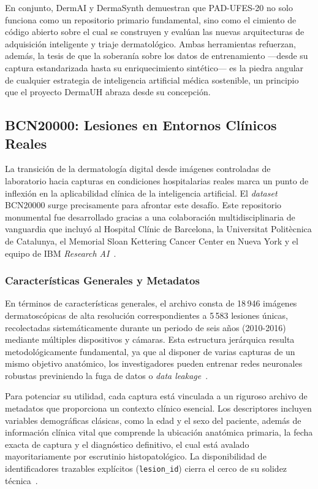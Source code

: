 En conjunto, DermAI y DermaSynth demuestran que PAD-UFES-20 no solo funciona como un repositorio primario 
fundamental, sino como el cimiento de código abierto sobre el cual se construyen y evalúan las nuevas 
arquitecturas de adquisición inteligente y triaje dermatológico. Ambas herramientas refuerzan, además, la 
tesis de que la soberanía sobre los datos de entrenamiento ---desde su captura estandarizada hasta su 
enriquecimiento sintético--- es la piedra angular de cualquier estrategia de inteligencia artificial 
médica sostenible, un principio que el proyecto DermaUH abraza desde su concepción.


\subsection{BCN20000: Lesiones en Entornos Clínicos Reales}\label{sec:bcn20000}

La transición de la dermatología digital desde imágenes controladas de laboratorio hacia capturas en 
condiciones hospitalarias reales marca un punto de inflexión en la aplicabilidad clínica de la inteligencia 
artificial. El \textit{dataset} BCN20000 surge precisamente para afrontar este desafío. Este repositorio 
monumental fue desarrollado gracias a una colaboración multidisciplinaria de vanguardia que incluyó al 
Hospital Clínic de Barcelona, la Universitat Politècnica de Catalunya, el Memorial Sloan Kettering 
Cancer Center en Nueva York y el equipo de IBM \textit{Research AI}~\cite{scidata_bcn20000}. 

\subsubsection{Características Generales y Metadatos}

En términos de características generales, el archivo consta de 18\,946 imágenes dermatoscópicas de alta 
resolución correspondientes a 5\,583 lesiones únicas, recolectadas sistemáticamente durante un periodo de 
seis años (2010-2016) mediante múltiples dispositivos y cámaras. Esta estructura jerárquica resulta 
metodológicamente fundamental, ya que al disponer de varias capturas de un mismo objetivo anatómico, 
los investigadores pueden entrenar redes neuronales robustas previniendo la fuga de 
datos o \textit{data leakage}~\cite{arxiv_bcn20000,scidata_bcn20000}. 

Para potenciar su utilidad, cada captura está vinculada a un riguroso archivo de metadatos que proporciona 
un contexto clínico esencial. Los descriptores incluyen variables demográficas clásicas, como la edad y 
el sexo del paciente, además de información clínica vital que comprende la ubicación anatómica primaria, 
la fecha exacta de captura y el diagnóstico definitivo, el cual está avalado mayoritariamente por escrutinio 
histopatológico. La disponibilidad de identificadores trazables explícitos (\texttt{lesion\_id}) cierra 
el cerco de su solidez técnica~\cite{scidata_bcn20000}.

